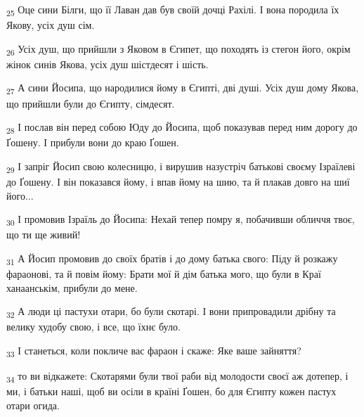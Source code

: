 \begin{tcolorbox}
\textsubscript{25} Оце сини Білги, що її Лаван дав був своїй дочці Рахілі. І вона породила їх Якову, усіх душ сім.
\end{tcolorbox}
\begin{tcolorbox}
\textsubscript{26} Усіх душ, що прийшли з Яковом в Єгипет, що походять із стегон його, окрім жінок синів Якова, усіх душ шістдесят і шість.
\end{tcolorbox}
\begin{tcolorbox}
\textsubscript{27} А сини Йосипа, що народилися йому в Єгипті, дві душі. Усіх душ дому Якова, що прийшли були до Єгипту, сімдесят.
\end{tcolorbox}
\begin{tcolorbox}
\textsubscript{28} І послав він перед собою Юду до Йосипа, щоб показував перед ним дорогу до Ґошену. І прибули вони до краю Ґошен.
\end{tcolorbox}
\begin{tcolorbox}
\textsubscript{29} І запріг Йосип свою колесницю, і вирушив назустріч батькові своєму Ізраїлеві до Ґошену. І він показався йому, і впав йому на шию, та й плакав довго на шиї його...
\end{tcolorbox}
\begin{tcolorbox}
\textsubscript{30} І промовив Ізраїль до Йосипа: Нехай тепер помру я, побачивши обличчя твоє, що ти ще живий!
\end{tcolorbox}
\begin{tcolorbox}
\textsubscript{31} А Йосип промовив до своїх братів і до дому батька свого: Піду й розкажу фараонові, та й повім йому: Брати мої й дім батька мого, що були в Краї ханаанськім, прибули до мене.
\end{tcolorbox}
\begin{tcolorbox}
\textsubscript{32} А люди ці пастухи отари, бо були скотарі. І вони припровадили дрібну та велику худобу свою, і все, що їхнє було.
\end{tcolorbox}
\begin{tcolorbox}
\textsubscript{33} І станеться, коли покличе вас фараон і скаже: Яке ваше зайняття?
\end{tcolorbox}
\begin{tcolorbox}
\textsubscript{34} то ви відкажете: Скотарями були твої раби від молодости своєї аж дотепер, і ми, і батьки наші, щоб ви осіли в країні Ґошен, бо для Єгипту кожен пастух отари огида.
\end{tcolorbox}

